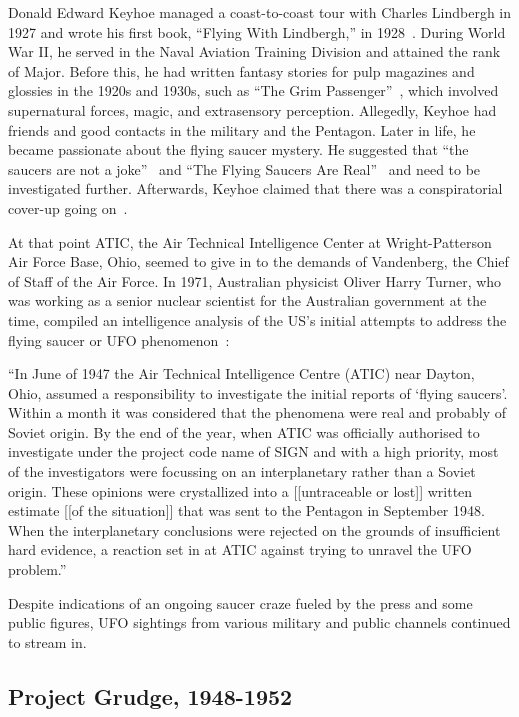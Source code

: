 Donald Edward Keyhoe managed a coast-to-coast tour with Charles Lindbergh in 1927 and wrote his first book, ``Flying With Lindbergh,''
in 1928~\cite{Keyhoe1928}. During World War II, he served in the Naval Aviation Training Division and attained the rank of Major.
Before this, he had written fantasy stories for pulp magazines and glossies in the 1920s and 1930s, such as
``The Grim Passenger''~\cite{WeirdTalesKeyhoe-25}, which involved supernatural forces, magic, and extrasensory perception.
Allegedly, Keyhoe had friends and good contacts in the military and the Pentagon.
Later in life, he became passionate about the flying saucer mystery.
He suggested that ``the saucers are not a joke''~\cite{KeyhoeFSAR1950} and ``The Flying Saucers Are Real''~\cite{KeyhoeFSAR1950,Keyhoe1950}
and need to be investigated further.
Afterwards, Keyhoe claimed that there was a conspiratorial cover-up going on~\cite{Keyhoe1955}.

At that point ATIC, the Air Technical Intelligence Center at Wright-Patterson Air Force Base, Ohio, seemed to give in to the demands of
Vandenberg, the Chief of Staff of the Air Force.
In 1971, Australian physicist Oliver Harry Turner, who was working as a senior nuclear scientist for the Australian government at the time, compiled an intelligence analysis of the US's initial attempts to address the flying saucer or UFO phenomenon~\cite{TurnerAustralia1971}:
\begin{svgraybox}
``In June of 1947 the Air Technical Intelligence Centre
(ATIC) near Dayton, Ohio, assumed a responsibility to investigate
the initial reports of `flying saucers'. Within a month it was
considered that the phenomena were real and probably of Soviet
origin. By the end of the year, when ATIC was officially authorised
to investigate under the project code name of SIGN and with a high
priority, most of the investigators were focussing on an interplanetary
rather than a Soviet origin. These opinions were
crystallized into a [[untraceable or lost]] written estimate [[of the situation]] that was sent to the Pentagon
in September 1948. When the interplanetary conclusions were rejected
on the grounds of insufficient hard evidence, a reaction set in at
ATIC against trying to unravel the UFO problem.''
\end{svgraybox}


Despite indications of an ongoing saucer craze fueled by the press and some public figures, UFO sightings from various military and public channels continued to stream in.

\subsection{Project Grudge, 1948-1952}
\label{2023-UFO-part-Perception-types-USA-Grudge}

